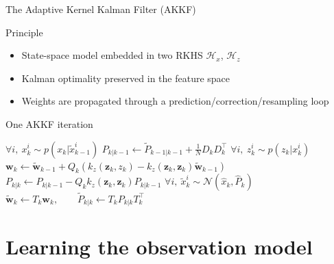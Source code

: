 \documentclass[9pt]{beamer}
\begin{document}
\begin{frame}{The Adaptive Kernel Kalman Filter (AKKF)}

\begin{block}{Principle}
    \begin{itemize}
    \item State-space model embedded in two RKHS $\mathcal{H}_x$, $\mathcal{H}_z$
    \item Kalman optimality preserved in the feature space
    \item Weights are propagated through a prediction/correction/resampling loop
    \end{itemize}
\end{block}

\begin{block}{One AKKF iteration}
\begin{algorithmic}
    \State$\forall i,\:x_k^i\sim p(x_k|\tilde{x}_{k-1}^i)$
    \State$P_{k|k-1}\gets\tilde{P}_{k-1|k-1}+\frac{1}{N}D_kD_k^\top$
    \State$\forall i,\:z_k^i\sim p(z_k|x_k^i)$\Comment{\textcolor{BrickRed}{DSSM correction: requires $h_k$}}
    \State$\mathbf{w}_k\gets\tilde{\mathbf{w}}_{k-1}+Q_k(k_z(\mathbf{z}_k,z_k)-k_z(\mathbf{z}_k,\mathbf{z}_k)\tilde{\mathbf{w}}_{k-1})$
    \State$P_{k|k}\gets P_{k|k-1}-Q_kk_z(\mathbf{z}_k,\mathbf{z}_k)P_{k|k-1}$
    \State$\forall i,\:\tilde{x}_k^i\sim\mathcal{N}(\hat{x}_k, \hat{P}_k)$
    \State$\tilde{\mathbf{w}}_k\gets T_k\mathbf{w}_k,\qquad\tilde{P}_{k|k}\gets T_kP_{k|k}T_k^\top$
\end{algorithmic}
\end{block}

\end{frame}

\section{Learning the observation model}
\end{document}
